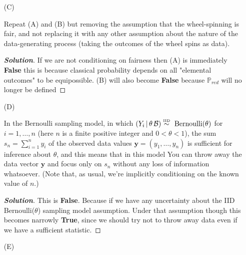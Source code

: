 \documentclass[12pt]{article}
\newcommand{\given}{\, | \,}
\newenvironment{solution}{\begin{proof}[\textbf{\textit{Solution}}] }{\end{proof}}
\begin{document}
\begin{itemize}
\item[(C)]

Repeat (A) and (B) but removing the assumption that the wheel-spinning is fair, and not replacing it with any other assumption about the nature of the data-generating process (taking the outcomes of the wheel spins as data).
\begin{tcolorbox}[breakable]
    \begin{solution}
        If we are not conditioning on fairness then (A) is immediately \textbf{False} this is because classical probability depends on all "elemental outcomes" to be equipossible. (B) will also become \textbf{False} because $\mathbb{P}_{red}$ will no longer be defined
    \end{solution}
\end{tcolorbox}


\item[(D)]

In the Bernoulli sampling model, in which $( Y_i \given \theta \, \mathcal B ) \stackrel{ \textrm{\tiny IID} }{ \sim } \textrm{ Bernoulli} ( \theta )$ for $i = 1, \dots, n$ (here $n$ is a finite positive integer and $0 < \theta < 1$), the sum $s_n = \sum_{ i = 1 }^n y_i$ of the observed data values $\bm{ y } = ( y_1, \dots, y_n )$ is sufficient for inference about $\theta$, and this means that in this model You can throw away the data vector $\bm{ y }$ and focus only on $s_n$ without any loss of information whatsoever. (Note that, as usual, we're implicitly conditioning on the known value of $n$.)
\begin{tcolorbox}[breakable]
    \begin{solution}
        This is \textbf{False}. Because if we have any uncertainty about the IID Bernoulli($\theta$) sampling model assumption. Under that assumption though this becomes narrowly \textbf{True}, since we should try not to throw away data even if we have a sufficient statistic. 
    \end{solution}
\end{tcolorbox}


\item[(E)]


\end{itemize}
\end{document}
